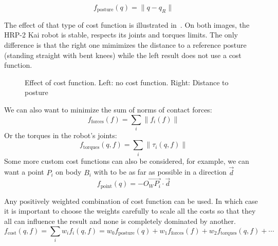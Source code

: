 \begin{equation*}
  f_\text{posture}(q) = \|q-q_R\|
\end{equation*}

The effect of that type of cost function is illustrated in~. On both images, the HRP-2 Kai robot is stable, respects its joints and torques limits. The only difference is that the right one mimimizes the distance to a reference posture (standing straight with bent knees) while the left result does not use a cost function.

\begin{figure}[htpb]
  \centering
  \setlength{\fboxsep}{0pt}%
  \setlength{\fboxrule}{1pt}%
  \caption{Effect of cost function. Left: no cost function. Right: Distance to posture}
\label{fig:cost}
\end{figure}

We can also want to minimize the sum of norms of contact forces:
\begin{equation*}
  f_\text{forces}(f) = \sum\limits_i \|f_i(f)\|
\end{equation*}
Or the torques in the robot's joints:
\begin{equation*}
  f_\text{torques}(q,f) = \sum\limits_i \|\tau_i(q,f)\|
\end{equation*}
Some more custom cost functions can also be considered, for example, we can want a point $P_i$ on body $B_i$ with to be as far as possible in a direction $\vec{d}$
\begin{equation*}
  f_\text{point} (q) = -{\overrightarrow{O_W P_i}}\cdot{\vec{d}}
\end{equation*}

Any positively weighted combination of cost function can be used. In which case it is important to choose the weights carefully to scale all the costs so that they all can influence the result and none is completely dominated by another.
\begin{equation}
  f_\text{cost}(q,f) = \sum\limits_i{w_i f_i(q,f)} = w_0 f_\text{posture}(q) + w_1 f_\text{forces}(f) + w_2 f_\text{torques}(q,f) + \cdots
\end{equation}



